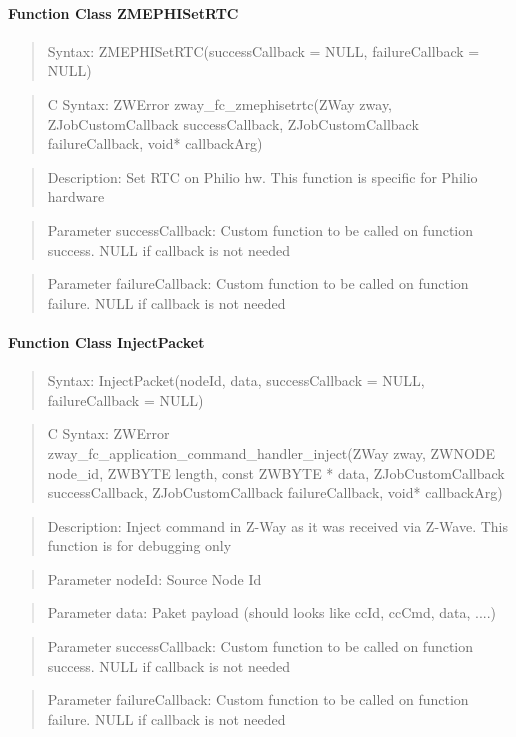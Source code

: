 \paragraph{Function Class ZMEPHISetRTC}
\begin{quote}Syntax: ZMEPHISetRTC(successCallback = NULL, failureCallback = NULL)\end{quote}
\begin{quote}C Syntax: ZWError zway\_fc\_zmephisetrtc(ZWay zway, ZJobCustomCallback successCallback, ZJobCustomCallback failureCallback, void* callbackArg)\end{quote}
\begin{quote}Description: Set RTC on Philio hw. This function is specific for Philio hardware\end{quote}
\begin{quote}Parameter successCallback: Custom function to be called on function success. NULL if callback is not needed\end{quote}
\begin{quote}Parameter failureCallback: Custom function to be called on function failure. NULL if callback is not needed\end{quote}


\paragraph{Function Class InjectPacket}
\begin{quote}Syntax: InjectPacket(nodeId, data, successCallback = NULL, failureCallback = NULL)\end{quote}
\begin{quote}C Syntax: ZWError zway\_fc\_application\_command\_handler\_inject(ZWay zway, ZWNODE node\_id, ZWBYTE length, const ZWBYTE * data, ZJobCustomCallback successCallback, ZJobCustomCallback failureCallback, void* callbackArg)\end{quote}
\begin{quote}Description: Inject command in Z-Way as it was received via Z-Wave. This function is for debugging only\end{quote}
\begin{quote}Parameter nodeId: Source Node Id\end{quote}
\begin{quote}Parameter data: Paket payload (should looks like ccId, ccCmd, data, ....)\end{quote}
\begin{quote}Parameter successCallback: Custom function to be called on function success. NULL if callback is not needed\end{quote}
\begin{quote}Parameter failureCallback: Custom function to be called on function failure. NULL if callback is not needed\end{quote}



